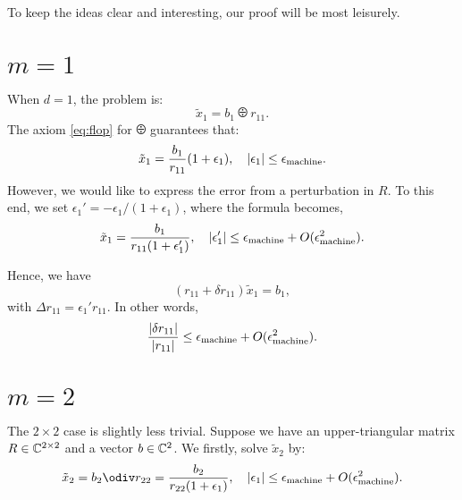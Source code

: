 To keep the ideas clear and interesting, our proof will be most leisurely.  

\section{$ m=1 $} 
When $d=1$, the problem is: 
\[
    \tilde x_1 = b_1 \odiv r_{11}. 
\]
The axiom \eqref{eq:flop} for $\odiv$ guarantees that: 
\[
    \tilde x_1 = \frac{b_1}{r_{ 11 } } (1+\epsilon _1), \quad |\epsilon _1| \le \epsilon_{\text{machine}}. 
\] 
However, we would like to express the error from a perturbation in $R$. To this end, we set $\epsilon _1' = -\epsilon _1 /(1+\epsilon _1)$, where the formula becomes, 
\begin{equation}
    \label{eq: m=1}
    \tilde x_1 = \frac{b_1}{r_{11} (1+\epsilon _1')}, \quad |\epsilon '_1| \le \epsilon_{\text{machine}} + O(\epsilon_{\text{machine}}^2). 
\end{equation}

Hence, we have 
\[
    (r_{ 11 } + \delta r_{ 11 } ) \tilde x_1 = b_1, 
\]
with $\Delta r_{ 11 }  = \epsilon _1' r_{ 11 } $. In other words, 
\[
    \frac{|\delta r_{ 11 } |}{|r_{ 11 } |} \le \epsilon_{\text{machine}} + O(\epsilon_{\text{machine}}^2).  
\]

\section{$m=2$} 
The $2\times 2$ case is slightly less trivial. Suppose we have an upper-triangular matrix $R\in \mathbb{C}^{2\times 2}$ and a vector $b\in \mathbb{C}^2$. We firstly, solve $\tilde x_2$ by: 
\begin{equation}
    \label{eq: m=2 x2}
    \tilde x_2 = b_2 \odiv r_{ 22 }  = \frac{b_2}{r_{ 22 } (1+\epsilon _1)}, \quad |\epsilon _1|\le \mep + O(\mep^2).     
\end{equation}

